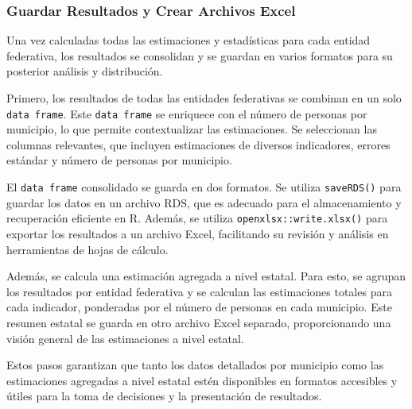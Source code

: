 \documentclass[
  12pt,
]{book}
\begin{document}
\hypertarget{guardar-resultados-y-crear-archivos-excel}{%
\subsubsection*{Guardar Resultados y Crear Archivos Excel}\label{guardar-resultados-y-crear-archivos-excel}}

Una vez calculadas todas las estimaciones y estadísticas para cada entidad federativa, los resultados se consolidan y se guardan en varios formatos para su posterior análisis y distribución.

Primero, los resultados de todas las entidades federativas se combinan en un solo \texttt{data\ frame}. Este \texttt{data\ frame} se enriquece con el número de personas por municipio, lo que permite contextualizar las estimaciones. Se seleccionan las columnas relevantes, que incluyen estimaciones de diversos indicadores, errores estándar y número de personas por municipio.

El \texttt{data\ frame} consolidado se guarda en dos formatos. Se utiliza \texttt{saveRDS()} para guardar los datos en un archivo RDS, que es adecuado para el almacenamiento y recuperación eficiente en R. Además, se utiliza \texttt{openxlsx::write.xlsx()} para exportar los resultados a un archivo Excel, facilitando su revisión y análisis en herramientas de hojas de cálculo.

Además, se calcula una estimación agregada a nivel estatal. Para esto, se agrupan los resultados por entidad federativa y se calculan las estimaciones totales para cada indicador, ponderadas por el número de personas en cada municipio. Este resumen estatal se guarda en otro archivo Excel separado, proporcionando una visión general de las estimaciones a nivel estatal.

Estos pasos garantizan que tanto los datos detallados por municipio como las estimaciones agregadas a nivel estatal estén disponibles en formatos accesibles y útiles para la toma de decisiones y la presentación de resultados.
\end{document}
